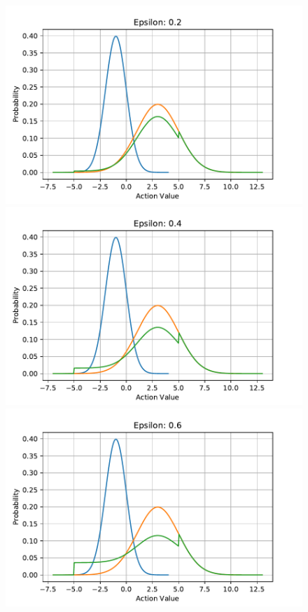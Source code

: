 \documentclass{article}
\begin{document}
\begin{figure}[htbp]
	\centering
	\includegraphics[scale=0.4]{img/noise22.pdf}
	\includegraphics[scale=0.4]{img/noise24.pdf}
	\includegraphics[scale=0.4]{img/noise26.pdf}

\end{figure}
\end{document}

